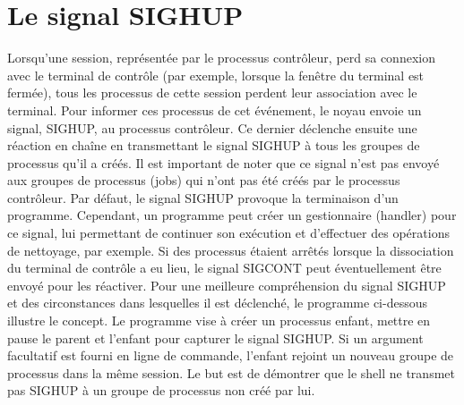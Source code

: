 \section{Le signal SIGHUP}

Lorsqu'une session, représentée par le processus contrôleur, perd sa connexion avec le terminal de contrôle (par exemple, lorsque la fenêtre du terminal est fermée), tous les processus de cette session perdent leur association avec le terminal.
Pour informer ces processus de cet événement, le noyau envoie un signal, SIGHUP, au processus contrôleur. Ce dernier déclenche ensuite une réaction en chaîne en transmettant le signal SIGHUP à tous les groupes de processus qu'il a créés. 
Il est important de noter que ce signal n'est pas envoyé aux groupes de processus (jobs) qui n'ont pas été créés par le processus contrôleur.
\newline
Par défaut, le signal SIGHUP provoque la terminaison d'un programme. Cependant, un programme peut créer un gestionnaire (handler) pour ce signal, lui permettant de continuer son exécution et d'effectuer des opérations de nettoyage, par exemple.
 Si des processus étaient arrêtés lorsque la dissociation du terminal de contrôle a eu lieu, le signal SIGCONT peut éventuellement être envoyé pour les réactiver.
\newline
Pour une meilleure compréhension du signal SIGHUP et des circonstances dans lesquelles il est déclenché, le programme ci-dessous illustre le concept. Le programme vise à créer un processus enfant, mettre en pause le parent et l'enfant pour capturer 
le signal SIGHUP. Si un argument facultatif est fourni en ligne de commande, l'enfant rejoint un nouveau groupe de processus dans la même session. Le but est de démontrer que le shell ne transmet pas SIGHUP à un groupe de processus non créé par lui. 

